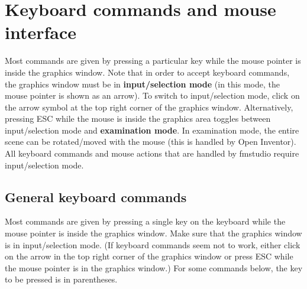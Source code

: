 \documentclass[letter,12pt]{article}
\begin{document}
\section{Keyboard commands and mouse interface}
\label{sec:commands}

Most commands are given by pressing a particular key while the mouse
pointer is inside the graphics window.  Note that in order to accept
keyboard commands, the graphics window must be in {\bf input/selection
  mode} (in this mode, the mouse pointer is shown as an arrow).  To
switch to input/selection mode, click on the arrow symbol at the top
right corner of the graphics window.  Alternatively, pressing ESC
while the mouse is inside the graphics area toggles between
input/selection mode and {\bf examination mode}.  In examination mode,
the entire scene can be rotated/moved with the mouse (this is handled
by Open Inventor).  All keyboard commands and mouse actions that are
handled by fmstudio require input/selection mode.


\subsection{General keyboard commands}
\label{sec:general_commands}

Most commands are given by pressing a single key on the keyboard while
the mouse pointer is inside the graphics window.  Make sure that the
graphics window is in input/selection mode.  (If keyboard commands
seem not to work, either click on the arrow in the top right corner of
the graphics window or press ESC while the mouse pointer is in the
graphics window.)  For some commands below, the key to be pressed is
in parentheses.
\end{document}
